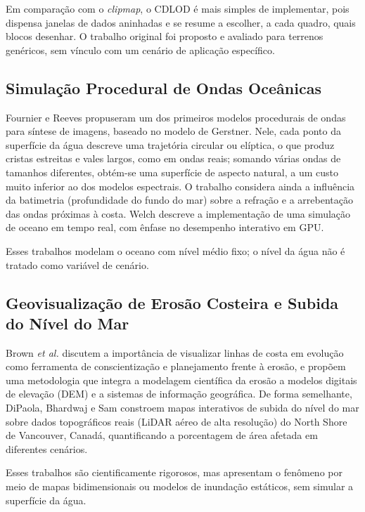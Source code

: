 \documentclass[conference]{IEEEtran}
\begin{document}
Em comparação com o \emph{clipmap}, o CDLOD é mais simples de
implementar, pois dispensa janelas de dados aninhadas e se resume a
escolher, a cada quadro, quais blocos desenhar. O trabalho original foi
proposto e avaliado para terrenos genéricos, sem vínculo com um cenário
de aplicação específico.

\subsection{Simulação Procedural de Ondas Oceânicas}

Fournier e Reeves \cite{fournierreeves1986} propuseram um dos primeiros
modelos procedurais de ondas para síntese de imagens, baseado no modelo
de Gerstner. Nele, cada ponto da superfície da água descreve uma
trajetória circular ou elíptica, o que produz cristas estreitas e vales
largos, como em ondas reais; somando várias ondas de tamanhos
diferentes, obtém-se uma superfície de aspecto natural, a um custo muito
inferior ao dos modelos espectrais. O trabalho considera ainda a
influência da batimetria (profundidade do fundo do mar) sobre a
refração e a arrebentação das ondas próximas à costa. Welch \cite{welch}
descreve a implementação de uma simulação de oceano em tempo real, com
ênfase no desempenho interativo em GPU.

Esses trabalhos modelam o oceano com nível médio fixo; o nível da água
não é tratado como variável de cenário.

\subsection{Geovisualização de Erosão Costeira e Subida do Nível do Mar}

Brown \emph{et al.} \cite{brown2006} discutem a importância de visualizar
linhas de costa em evolução como ferramenta de conscientização e
planejamento frente à erosão, e propõem uma metodologia que integra a
modelagem científica da erosão a modelos digitais de elevação (DEM) e a
sistemas de informação geográfica. De forma semelhante, DiPaola,
Bhardwaj e Sam \cite{dipaola2023} constroem mapas interativos de subida
do nível do mar sobre dados topográficos reais (LiDAR aéreo de alta
resolução) do North Shore de Vancouver, Canadá, quantificando a
porcentagem de área afetada em diferentes cenários.

Esses trabalhos são cientificamente rigorosos, mas apresentam o
fenômeno por meio de mapas bidimensionais ou modelos de inundação
estáticos, sem simular a superfície da água.
\end{document}
